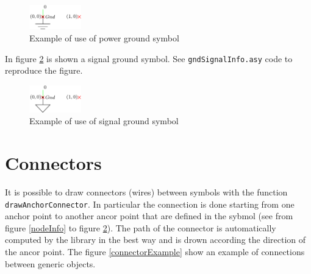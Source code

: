 \documentclass[a4paper,12pt]{report}
\begin{document}
\begin{figure}[ht]
\centering
\includegraphics[width=0.2\textwidth]{gndPowerInfo}
\caption{Example of use of power ground symbol}
\label{gndPowerInfo}
\end{figure}

In figure \ref{gndSignalInfo} is shown a signal ground symbol. See \texttt{gndSignalInfo.asy} code to reproduce the figure.

\begin{figure}[ht]
\centering
\includegraphics[width=0.2\textwidth]{gndSignalInfo}
\caption{Example of use of signal ground symbol}
\label{gndSignalInfo}
\end{figure}

\section*{Connectors}

It is possible to draw connectors (wires) between symbols with the function \texttt{drawAnchorConnector}. In particular the
connection is done starting from one anchor point to another ancor point that are defined in the sybmol (see from figure \ref{nodeInfo} to figure \ref{gndSignalInfo}).
The path of the connector is automatically computed by the library in the best way and is drown according the direction
of the ancor point. The figure \ref{connectorExample} show an example of connections
between generic objects.
\end{document}
